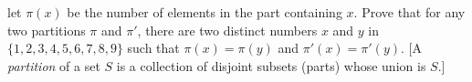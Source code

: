 let $\pi(x)$ be the number of elements in the part containing $x$.
Prove that for any two partitions $\pi$ and $\pi'$, there are two
distinct numbers $x$ and $y$ in $\{1, 2, 3, 4, 5, 6, 7, 8, 9\}$
such that $\pi(x) = \pi(y)$ and $\pi'(x) = \pi'(y)$. [A {\em
partition} of a set $S$ is a collection of disjoint subsets (parts)
whose union is $S$.]
